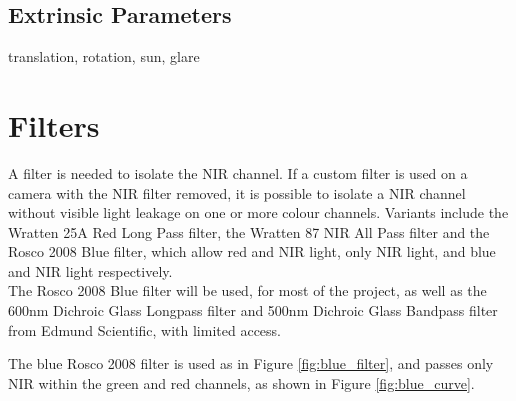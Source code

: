 \subsection{Extrinsic Parameters}

translation, rotation, sun, glare

\section{Filters}

A filter is needed to isolate the NIR channel. If a custom filter is used on a camera with the NIR filter removed, it is possible to isolate a NIR channel without visible light leakage on one or more colour channels. Variants include the Wratten 25A Red Long Pass filter, the Wratten 87 NIR All Pass filter and the Rosco 2008 Blue filter, which allow red and NIR light, only NIR light, and blue and NIR light respectively.\\

The Rosco 2008 Blue filter will be used, for most of the project, as well as the 600nm Dichroic Glass Longpass filter and 500nm Dichroic Glass Bandpass filter from Edmund Scientific, with limited access.

The blue Rosco 2008 filter is used as in Figure \ref{fig:blue_filter}, and passes only NIR within the green and red channels, as shown in Figure \ref{fig:blue_curve}.

